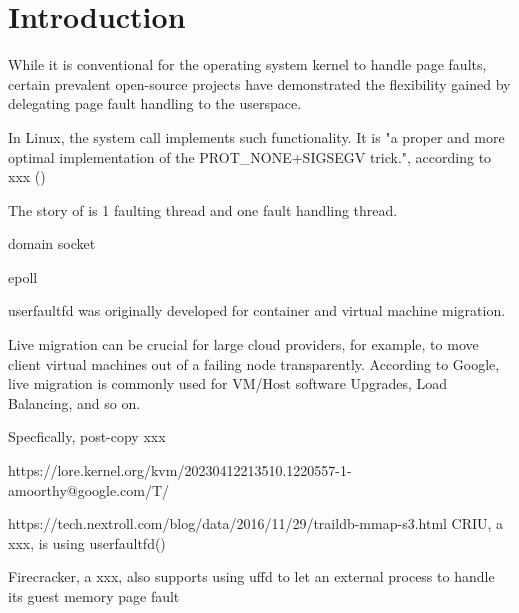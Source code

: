 \section{Introduction}
\label{sec:introduction}



While it is conventional for the operating system kernel to handle page faults, certain prevalent open-source projects have demonstrated the flexibility gained by delegating page fault handling to the userspace.

In Linux, the  system call implements such functionality. It is "a proper and more optimal implementation of the PROT\_NONE+SIGSEGV trick.", according to xxx ()

The story of  is 
1 faulting thread and one fault handling thread.

domain socket

epoll

userfaultfd was originally developed for container and virtual machine migration.

Live migration can be crucial for large cloud providers, for example, to move client virtual machines out of a failing node transparently. According to Google, live migration is commonly used for VM/Host software Upgrades, Load Balancing, and so on\cite{google-live-migration-at-scale}.

Specfically, post-copy xxx\cite{post-copy}



https://lore.kernel.org/kvm/20230412213510.1220557-1-amoorthy@google.com/T/


https://tech.nextroll.com/blog/data/2016/11/29/traildb-mmap-s3.html
CRIU, a xxx, is using userfaultfd()

Firecracker, a xxx, also supports using uffd to let an external process to handle its guest memory page fault

